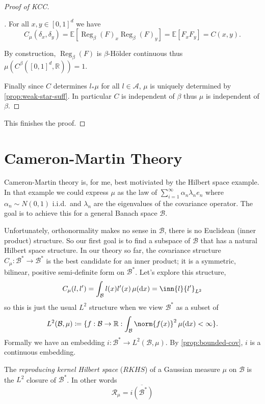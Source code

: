 \documentclass[fontsize=12pt, DIV=10]{scrreprt}
\theoremstyle{remark}
\newenvironment{subproof}[1][\proofname]{%
  \renewcommand{\qedsymbol}{$\blacksquare$}%
  \begin{proof}[#1]%
}{%
  \end{proof}%
}
\newcommand{\defeq}{\coloneqq}
\newcommand{\R}{\mathbb R}
\newcommand{\E}{\mathbb E}
\newcommand{\calA}{\mathcal A}
\newcommand{\calB}{\mathcal B}
\newcommand{\calR}{\mathcal R}
\newcommand{\dif}[1]{\text{d} #1}
\DeclareMathOperator{\reg}{Reg}
\newcommand{\unitbox}{\ensuremath{[0,1]^d}}
\newcommand{\mudif}{\ensuremath{\, \mu(\dif x)}}
\begin{document}
\begin{proof}[Proof of KCC]
\begin{subproof}
		For all $x, y \in [0, 1]^d$ we have
		\begin{equation}
			C_{\mu}(\delta_x, \delta_y) = \E[\reg_{\beta}(F)_x \reg_{\beta}(F)_y]
			= \E[F_x F_y] = C(x, y).
		\end{equation}

		By construction, $\reg_{\beta}(F)$ is $\beta$-H\"older continuous thus $\mu(C^{\beta}(\unitbox, \R)) = 1$.

		Finally since $C$ determines $l_* \mu$ for all $l \in \calA$, $\mu$ is uniquely determined by \vref{prop:weak-star-suff}. In particular $C$ is independent of $\beta$ thus $\mu$ is independent of $\beta$.
	\end{subproof}

	This finishes the proof.
\end{proof}

\section{Cameron-Martin Theory}

Cameron-Martin theory is, for me, best motiviated by the Hilbert space example. In that example we could express $\mu$ as the law of $\sum_{i=1}^{\infty} \alpha_n \lambda_n e_n$ where $\alpha_n \sim N(0, 1)$ i.i.d.\ and $\lambda_n$ are the eigenvalues of the covariance operator. The goal is to achieve this for a general Banach space $\calB$.

Unfortunately, orthonormality makes no sense in $\calB$, there is no Euclidean (inner product) structure. So our first goal is to find a subspace of $\calB$ that has a natural Hilbert space structure. In our theory so far, the covariance structure $C_{\mu}: \calB^* \to \calB^*$ is the best candidate for an inner product; it is a symmetric, bilinear, positive semi-definite form on $\calB^*$. Let's explore this structure, 
\begin{equation}
	C_{\mu}(l, l') = \int_{\calB} l(x) l'(x) \mudif = \inn{l}{l'}_{L^2}
\end{equation}
so this is just the usual $L^2$ structure when we view $\calB^*$ as a subset of
\begin{equation}
	L^2(\calB, \mu) \defeq \{f: \calB \to \R : \int_{\calB} \norm{f(x)}^2 \mudif < \infty \}.
\end{equation}
Formally we have an embedding $i: \calB^* \to L^2(\calB, \mu)$. By \vref{prop:bounded-cov}, $i$ is a continuous embedding.
\begin{defn}
	The \emph{reproducing kernel Hilbert space} ($RKHS$) of a Gaussian measure $\mu$ on $\calB$ is the $L^2$ closure of $\calB^*$. In other words
	\begin{equation}
		\calR_{\mu} = \overline{i(\calB^*)}
	\end{equation}
\end{defn}
\end{document}
